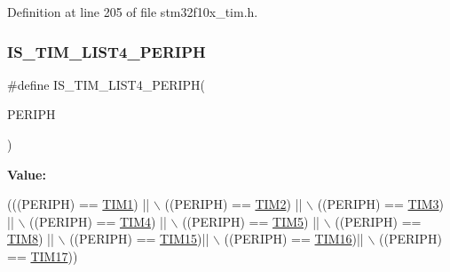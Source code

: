 Definition at line 205 of file stm32f10x\+\_\+tim.\+h.

\mbox{\label{group___t_i_m___exported__constants_ga9c2699fd3d0c0901f8ac706c3d2dfe10}} 
\subsubsection{\texorpdfstring{I\+S\+\_\+\+T\+I\+M\+\_\+\+L\+I\+S\+T4\+\_\+\+P\+E\+R\+I\+PH}{IS\_TIM\_LIST4\_PERIPH}}
{\footnotesize\ttfamily \#define I\+S\+\_\+\+T\+I\+M\+\_\+\+L\+I\+S\+T4\+\_\+\+P\+E\+R\+I\+PH(\begin{DoxyParamCaption}\item[{}]{P\+E\+R\+I\+PH }\end{DoxyParamCaption})}

{\bfseries Value\+:}
\begin{DoxyCode}
(((PERIPH) == \hyperlink{group___peripheral__declaration_ga2e87451fea8dc9380056d3cfc5ed81fb}{TIM1}) || \(\backslash\)
                                     ((PERIPH) == \hyperlink{group___peripheral__declaration_ga3cfac9f2e43673f790f8668d48b4b92b}{TIM2}) || \(\backslash\)
                                     ((PERIPH) == \hyperlink{group___peripheral__declaration_ga61ee4c391385607d7af432b63905fcc9}{TIM3}) || \(\backslash\)
                                     ((PERIPH) == \hyperlink{group___peripheral__declaration_ga91a09bad8bdc7a1cb3d85cf49c94c8ec}{TIM4}) || \(\backslash\)
                                     ((PERIPH) == \hyperlink{group___peripheral__declaration_ga5125ff6a23a2ed66e2e19bd196128c14}{TIM5}) || \(\backslash\)
                                     ((PERIPH) == \hyperlink{group___peripheral__declaration_ga9a3660400b17735e91331f256095810e}{TIM8}) || \(\backslash\)
                                     ((PERIPH) == \hyperlink{group___peripheral__declaration_ga87e4b442041d1c03a6af113fbe04a182}{TIM15})|| \(\backslash\)
                                     ((PERIPH) == \hyperlink{group___peripheral__declaration_ga73ec606e7dacf17e18c661e8ff8c7c8d}{TIM16})|| \(\backslash\)
                                     ((PERIPH) == \hyperlink{group___peripheral__declaration_ga65aea6c8b36439e44ad6cde0e6891aab}{TIM17}))
\end{DoxyCode}



